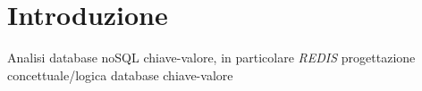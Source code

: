 \chapter*{Introduzione}
Analisi database noSQL chiave-valore, in particolare \emph{REDIS}
progettazione concettuale/logica database chiave-valore

